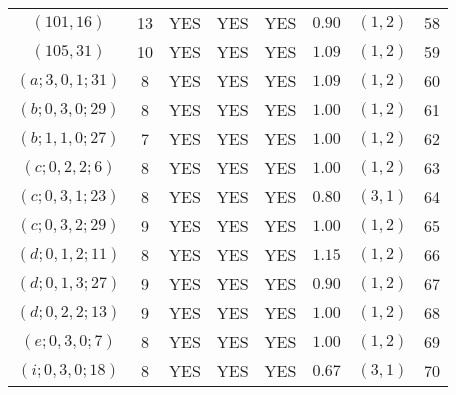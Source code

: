 \begin{longtable}{|c|c|c|c|c|c|c|c|}
$(101,16)$ & 13 & YES & YES & YES & $0.90$ & $(1,2)$ & 58\\
$(105,31)$ & 10 & YES & YES & YES & $1.09$ & $(1,2)$ & 59\\
$(a;3,0,1;31)$ & 8 & YES & YES & YES & $1.09$ & $(1,2)$ & 60\\
$(b;0,3,0;29)$ & 8 & YES & YES & YES & $1.00$ & $(1,2)$ & 61\\
$(b;1,1,0;27)$ & 7 & YES & YES & YES & $1.00$ & $(1,2)$ & 62\\
$(c;0,2,2;6)$ & 8 & YES & YES & YES & $1.00$ & $(1,2)$ & 63\\
$(c;0,3,1;23)$ & 8 & YES & YES & YES & $0.80$ & $(3,1)$ & 64\\
$(c;0,3,2;29)$ & 9 & YES & YES & YES & $1.00$ & $(1,2)$ & 65\\
$(d;0,1,2;11)$ & 8 & YES & YES & YES & $1.15$ & $(1,2)$ & 66\\
$(d;0,1,3;27)$ & 9 & YES & YES & YES & $0.90$ & $(1,2)$ & 67\\
$(d;0,2,2;13)$ & 9 & YES & YES & YES & $1.00$ & $(1,2)$ & 68\\
$(e;0,3,0;7)$ & 8 & YES & YES & YES & $1.00$ & $(1,2)$ & 69\\
$(i;0,3,0;18)$ & 8 & YES & YES & YES & $0.67$ & $(3,1)$ & 70
\end{longtable}
